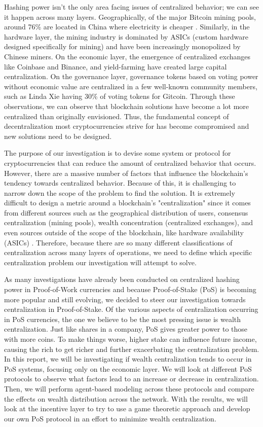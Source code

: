 Hashing power isn't the only area facing issues of centralized behavior; we can see it happen across many layers. Geographically, of the major Bitcoin mining pools, around 76\% are located in China where electricity is cheaper \cite{CRYPTO:2}. Similarly, in the hardware layer, the mining industry is dominated by ASICs (custom hardware designed specifically for mining) and have been increasingly monopolized by Chinese miners. On the economic layer, the emergence of centralized exchanges like Coinbase and Binance, and yield-farming have created large capital centralization. On the governance layer, governance tokens based on voting power without economic value are centralized in a few well-known community members, such as Linda Xie having 30\% of voting tokens for Gitcoin. Through these observations, we can observe that blockchain solutions have become a lot more centralized than originally envisioned. Thus, the fundamental concept of decentralization most cryptocurrencies strive for has become compromised and new solutions need to be designed.

The purpose of our investigation is to devise some system or protocol for cryptocurrencies that can reduce the amount of centralized behavior that occurs. However, there are a massive number of factors that influence the blockchain's tendency towards centralized behavior. Because of this, it is challenging to narrow down the scope of the problem to find the solution. It is extremely difficult to design a metric around a blockchain's "centralization" since it comes from different sources such as the geographical distribution of users, consensus centralization (mining pools), wealth concentration (centralized exchanges), and even sources outside of the scope of the blockchain, like hardware availability (ASICs) \cite{CRYPTO:5}. Therefore, because there are so many different classifications of centralization across many layers of operations, we need to define which specific centralization problem our investigation will attempt to solve.

As many investigations have already been conducted on centralized hashing power in Proof-of-Work currencies and because Proof-of-Stake (PoS) is becoming more popular and still evolving, we decided to steer our investigation towards centralization in Proof-of-Stake. Of the various aspects of centralization occurring in PoS currencies, the one we believe to be the most pressing issue is wealth centralization. Just like shares in a company, PoS gives greater power to those with more coins. To make things worse, higher stake can influence future income, causing the rich to get richer and further exacerbating the centralization problem. In this report, we will be investigating if wealth centralization tends to occur in PoS systems, focusing only on the economic layer. We will look at different PoS protocols to observe what factors lead to an increase or decrease in centralization. Then, we will perform agent-based modeling across these protocols and compare the effects on wealth distribution across the network. With the results, we will look at the incentive layer to try to use a game theoretic approach and develop our own PoS protocol in an effort to minimize wealth centralization.

